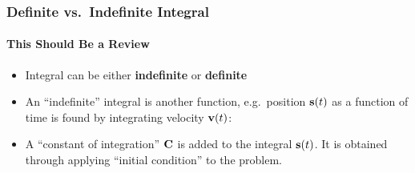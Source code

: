 \documentclass[12pt,compress,aspectratio=169]{beamer}
\newcommand{\mb}[1]{\ensuremath\mathbf{#1}}
\newcommand{\eq}[2]{\vspace{#1}{\Large\begin{displaymath}#2\end{displaymath}}}
\begin{document}
\begin{frame}
  \frametitle{Definite vs.\ Indefinite Integral}
  \framesubtitle{This Should Be a Review}
  \begin{itemize}
  \item Integral can be either \textbf{indefinite} or \textbf{definite}
  \item An ``indefinite'' integral is another function, e.g.\ position
    $\mb{s}(t)$ as a function of time is found by integrating velocity
    $\mb{v}(t)$:

    \eq{-.2in}{
      \mb{s}(t)=\int\mb{v}(t)dt=\cdots+\mb{C}
    }
  \item A ``constant of integration'' $\mb{C}$ is added to the integral
    $\mb{s}(t)$. It is obtained through applying ``initial condition'' to the
    problem.
  \end{itemize}
\end{frame}
\end{document}
